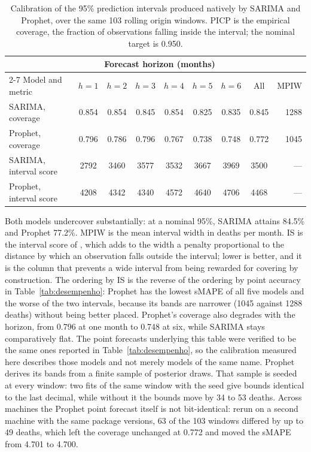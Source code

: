 \begin{table}[htbp]
\centering
\small
\setlength{\tabcolsep}{5pt}
\caption{Calibration of the 95\% prediction intervals produced natively by SARIMA and
Prophet, over the same 103 rolling origin windows. PICP is the
empirical coverage, the fraction of observations falling inside the interval; the nominal
target is 0.950.}
\label{tab:calibracao}
\begin{tabular}{lcccccccr}
\toprule
& \multicolumn{6}{c}{Forecast horizon (months)} & & \\
\cmidrule(lr){2-7}
Model and metric & $h=1$ & $h=2$ & $h=3$ & $h=4$ & $h=5$ & $h=6$ & All & MPIW \\
\midrule
SARIMA, coverage & 0.854 & 0.854 & 0.845 & 0.854 & 0.825 & 0.835 & 0.845 & 1288 \\
Prophet, coverage & 0.796 & 0.786 & 0.796 & 0.767 & 0.738 & 0.748 & 0.772 & 1045 \\
\midrule
SARIMA, interval score & 2792 & 3460 & 3577 & 3532 & 3667 & 3969 & 3500 & --- \\
Prophet, interval score & 4208 & 4342 & 4340 & 4572 & 4640 & 4706 & 4468 & --- \\
\bottomrule
\end{tabular}

\vspace{0.5em}
\begin{minipage}{\textwidth}
\footnotesize
Both models undercover substantially: at a nominal 95\%, SARIMA attains
84.5\% and Prophet 77.2\%.
MPIW is the mean interval width in deaths per month. IS is the interval score of
\citet{gneiting2007}, which adds to the width a penalty proportional to the distance by
which an observation falls outside the interval; lower is better, and it is the column that
prevents a wide interval from being rewarded for covering by construction. The ordering by
IS is the reverse of the ordering by point accuracy in
Table~\ref{tab:desempenho}: Prophet has the lowest sMAPE of all five models and the worse
of the two intervals, because its bands are narrower
(1045 against 1288
deaths) without being better placed. Prophet's coverage also degrades with the horizon,
from 0.796 at one month to
0.748 at six, while SARIMA stays comparatively flat.
The point forecasts underlying this table were verified to be the same ones reported in
Table~\ref{tab:desempenho}, so the calibration measured here describes those models and
not merely models of the same name. Prophet derives its bands from a finite sample of posterior draws. That sample is seeded
at every window: two fits of the same window with the seed give bounds identical to the
last decimal, while without it the bounds move by
34 to 53 deaths. Across
machines the Prophet point forecast itself is not bit-identical: rerun on a second machine
with the same package versions, 63 of the 103 windows
differed by up to 49 deaths, which left the coverage unchanged at
0.772 and moved the sMAPE from 4.701 to
4.700.
\end{minipage}
\end{table}
